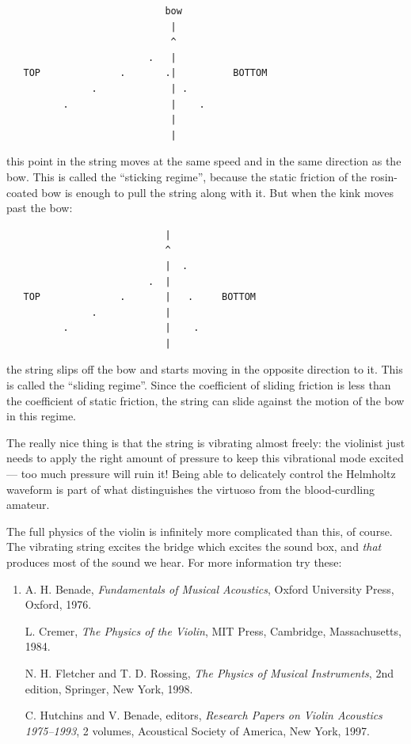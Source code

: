 \documentclass{article}
\begin{document}
\begin{verbatim}
                            bow
                             |
                             ^
                         .   |
   TOP              .       .|          BOTTOM
               .             | .
          .                  |    .
                             |
                             |
\end{verbatim}

this point in the string moves at the same speed and in the same
direction as the bow. This is called the ``sticking regime'', because
the static friction of the rosin-coated bow is enough to pull the string
along with it. But when the kink moves past the bow:

\begin{verbatim}
                            |
                            ^
                            |  .
                         .  | 
   TOP              .       |   .     BOTTOM
               .            | 
          .                 |    .
                            |
\end{verbatim}

the string slips off the bow and starts moving in the opposite direction
to it. This is called the ``sliding regime''. Since the coefficient of
sliding friction is less than the coefficient of static friction, the
string can slide against the motion of the bow in this regime.

The really nice thing is that the string is vibrating almost freely: the
violinist just needs to apply the right amount of pressure to keep this
vibrational mode excited --- too much pressure will ruin it! Being able
to delicately control the Helmholtz waveform is part of what
distinguishes the virtuoso from the blood-curdling amateur.

The full physics of the violin is infinitely more complicated than this,
of course. The vibrating string excites the bridge which excites the
sound box, and \emph{that} produces most of the sound we hear. For more
information try these:

\begin{enumerate}
\def\labelenumi{\arabic{enumi})}
\setcounter{enumi}{1}
\item
  A. H. Benade, \emph{Fundamentals of Musical Acoustics}, Oxford
  University Press, Oxford, 1976.

  L. Cremer, \emph{The Physics of the Violin}, MIT Press, Cambridge,
  Massachusetts, 1984.

  N. H. Fletcher and T. D. Rossing, \emph{The Physics of Musical
  Instruments}, 2nd edition, Springer, New York, 1998.

  C. Hutchins and V. Benade, editors, \emph{Research Papers on Violin
  Acoustics 1975--1993}, 2 volumes, Acoustical Society of America, New
  York, 1997.
\end{enumerate}
\end{document}
